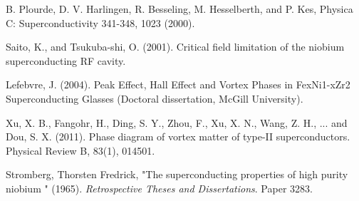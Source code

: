 \documentclass[twocolumn,aps,prl]{revtex4-1} %
\begin{document}
\begin{thebibliography}{9}

  B. Plourde, D. V. Harlingen, R. Besseling, M. Hesselberth, and P. Kes, Physica C: Superconductivity 341-348, 1023 (2000).

   Saito, K., and Tsukuba-shi, O. (2001). Critical field limitation of the niobium superconducting RF cavity.

 
	Lefebvre, J. (2004). Peak Effect, Hall Effect and Vortex Phases in FexNi1-xZr2 Superconducting Glasses (Doctoral dissertation, McGill University).	

	Xu, X. B., Fangohr, H., Ding, S. Y., Zhou, F., Xu, X. N., Wang, Z. H., ... and Dou, S. X. (2011). Phase diagram of vortex matter of type-II superconductors. Physical Review B, 83(1), 014501.

	Stromberg, Thorsten Fredrick, "The superconducting properties of high purity niobium " (1965). \textit{Retrospective Theses and Dissertations}.
Paper 3283.

\end{thebibliography}
\end{document}
